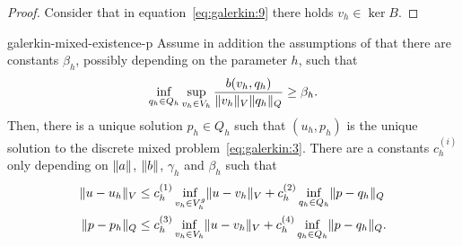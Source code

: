 \begin{proof}
  Consider that in equation~\eqref{eq:galerkin:9} there holds
  $v_h\in\ker B$.
\end{proof}

\begin{Theorem}{galerkin-mixed-existence-p}
  Assume in addition the assumptions of
   that there are constants
  $\beta_h$, possibly depending on the parameter $h$, such that
  \begin{gather}
    \label{eq:galerkin:10}
    \inf_{q_h\in Q_h} \sup_{v_h\in V_h}
    \frac{b(v_h, q_h)}{\lVert v_h\rVert_V\lVert q_h\rVert_Q}
    \ge \beta_h.
  \end{gather}
  Then, there is a unique solution $p_h\in Q_h$ such that $(u_h, p_h)$
  is the unique solution to the discrete mixed
  problem~\eqref{eq:galerkin:3}. There are a constants $c_h^{(i)}$
  only depending on $\lVert a\rVert$, $\lVert b\rVert$, $\gamma_h$ and $\beta_h$
  such that
  \begin{align}
    \label{eq:galerkin:11}
    \lVert u-u_h\rVert_V
    &\le c_h^{(1)} \inf_{v_h\in V_h^g}\lVert u-v_h\rVert_V
    + c_h^{(2)} \inf_{q_h\in Q_h}\lVert p-q_h\rVert_Q \\
    \lVert p-p_h\rVert_Q
    &\le c_h^{(3)} \inf_{v_h\in V_h}\lVert u-v_h\rVert_V
    + c_h^{(4)} \inf_{q_h\in Q_h}\lVert p-q_h\rVert_Q.
  \end{align}
\end{Theorem}

